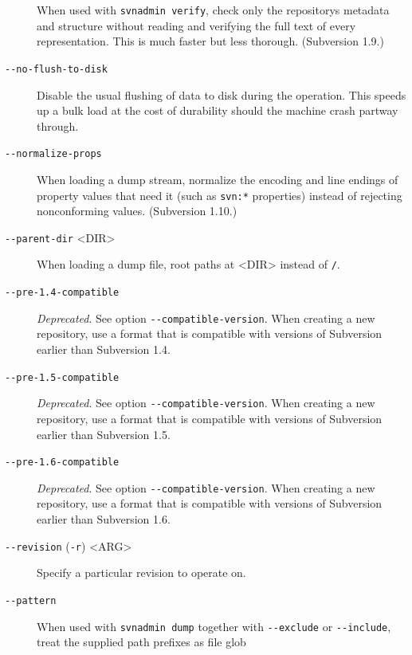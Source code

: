\begin{description}
When used with \texttt{svnadmin\ verify}, check only the
repository\textquotesingle s metadata and structure without reading and
verifying the full text of every representation. This is much faster but
less thorough. (Subversion 1.9.)
\item[\protect\phantomsection\label{svn.ref.svnadmin.sw.no_flush_to_disk}{}\texttt{-\/-no-flush-to-disk}]
Disable the usual flushing of data to disk during the operation. This
speeds up a bulk load at the cost of durability should the machine crash
partway through.
\item[\protect\phantomsection\label{svn.ref.svnadmin.sw.normalize_props}{}\texttt{-\/-normalize-props}]
When loading a dump stream, normalize the encoding and line endings of
property values that need it (such as \texttt{svn:*} properties) instead
of rejecting nonconforming values. (Subversion 1.10.)
\item[\protect\phantomsection\label{svn.ref.svnadmin.sw.parent_dir}{}\texttt{-\/-parent-dir}
\textless DIR\textgreater{}]
When loading a dump file, root paths at \textless DIR\textgreater{}
instead of \texttt{/}.
\item[\protect\phantomsection\label{svn.ref.svnadmin.sw.pre_1.4_compatible}{}\texttt{-\/-pre-1.4-compatible}]
\emph{Deprecated}. See option \texttt{-\/-compatible-version}. When
creating a new repository, use a format that is compatible with versions
of Subversion earlier than Subversion 1.4.
\item[\protect\phantomsection\label{svn.ref.svnadmin.sw.pre_1.5_compatible}{}\texttt{-\/-pre-1.5-compatible}]
\emph{Deprecated}. See option \texttt{-\/-compatible-version}. When
creating a new repository, use a format that is compatible with versions
of Subversion earlier than Subversion 1.5.
\item[\protect\phantomsection\label{svn.ref.svnadmin.sw.pre_1.6_compatible}{}\texttt{-\/-pre-1.6-compatible}]
\emph{Deprecated}. See option \texttt{-\/-compatible-version}. When
creating a new repository, use a format that is compatible with versions
of Subversion earlier than Subversion 1.6.
\item[\protect\phantomsection\label{svn.ref.svnadmin.sw.revision}{}\texttt{-\/-revision}
(\texttt{-r}) \textless ARG\textgreater{}]
Specify a particular revision to operate on.
\item[\protect\phantomsection\label{svn.ref.svnadmin.sw.pattern}{}\texttt{-\/-pattern}]
When used with \texttt{svnadmin\ dump} together with \texttt{-\/-exclude}
or \texttt{-\/-include}, treat the supplied path prefixes as file glob

\end{description}
